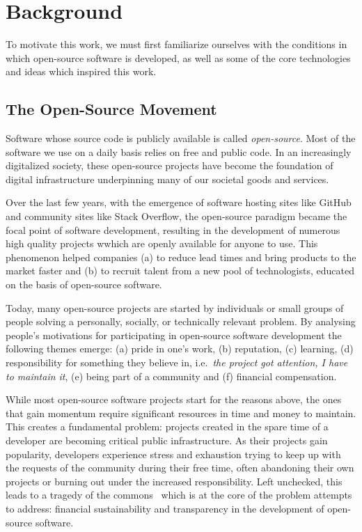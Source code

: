 \section{Background}

To motivate this work, we must first familiarize ourselves with the conditions
in which open-source software is developed, as well as some of the core
technologies and ideas which inspired this work.

\subsection{The Open-Source Movement} Software whose source code is publicly
available is called \emph{open-source}. Most of the software we use on a daily
basis relies on free and public code. In an increasingly digitalized society,
these open-source projects have become the foundation of digital infrastructure
underpinning many of our societal goods and services.

Over the last few years, with the emergence of software hosting sites like
GitHub and community sites like Stack Overflow, the open-source paradigm became
the focal point of software development, resulting in the development of
numerous high quality projects wwhich are openly available for anyone to use.
This phenomenon helped companies (a) to reduce lead times and bring products to
the market faster and (b) to recruit talent from a new pool of technologists,
educated on the basis of open-source software.

Today, many open-source projects are started by individuals or small groups of
people solving a personally, socially, or technically relevant problem. By
analysing people's motivations for participating in open-source software
development the following themes emerge: (a) pride in one's work, (b)
reputation, (c) learning, (d) responsibility for something they believe in,
i.e.\ \emph{the project got attention, I have to maintain it}, (e) being part
of a community and (f) financial compensation.

While most open-source software projects start for the reasons above, the ones
that gain momentum require significant resources in time and money to maintain.
This creates a fundamental problem: projects created in the spare time of a
developer are becoming critical public infrastructure. As their projects
gain popularity, developers experience stress and exhaustion trying to keep up
with the requests of the community during their free time, often abandoning
their own projects or burning out under the increased responsibility. Left
unchecked, this leads to a tragedy of the commons~\cite{tragedy-commons} which
is at the core of the problem \oscoin{} attempts to address: financial
sustainability and transparency in the development of open-source software.

